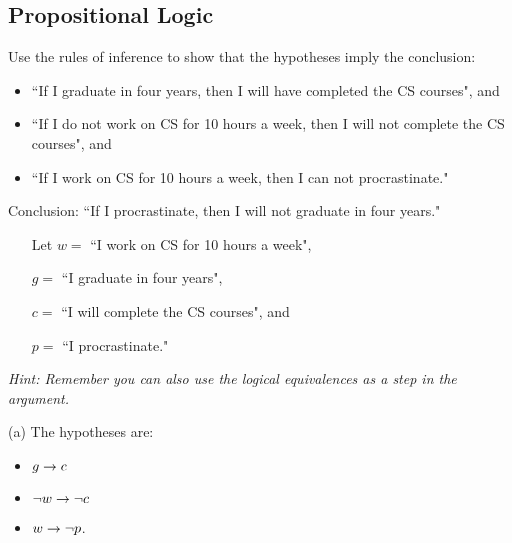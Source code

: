 \begin{questions}


\section*{Propositional Logic}


\label{probc} Use the rules of inference to show that the hypotheses imply the conclusion:
\begin{itemize}[itemsep=0pt,parsep=0pt,topsep=0pt,partopsep=0pt]
    \item ``If I graduate in four years, then I will have completed the CS courses", and
    \item ``If I do not work on CS for 10 hours a week, then I will not complete the CS courses", and
    \item ``If I work on CS for 10 hours a week, then I can not procrastinate."
\end{itemize}
Conclusion: ``If I procrastinate, then I will not graduate in four years."


\begin{itemize}[itemsep=0pt,parsep=0pt,topsep=0pt,partopsep=0pt,leftmargin=0.8in]
    \item[Let $w = $] ``I work on CS for 10 hours a week",
    \item[$g = $] ``I graduate in four years",
    \item[$c = $] ``I will complete the CS courses", and
    \item[$p = $] ``I procrastinate."
\end{itemize}


\textit{Hint: Remember you can also use the logical equivalences as a step in the argument.}
    \ifprintanswers
        \vspace{-12pt}
    \fi
\begin{solution}
  (a) The hypotheses are: 
  \begin{itemize}[itemsep=0pt,parsep=0pt,topsep=0pt,partopsep=0pt]
    \item $g \rightarrow c$
    \item  $\neg w \rightarrow \neg c$ 
    \item $w \rightarrow \neg p$.
  \end{itemize}


\end{solution}
\end{questions}
